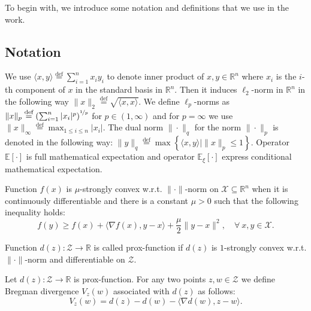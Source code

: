 \documentclass[runningheads]{llncs}
\def \R {\mathbb R}
\def\eqdef{\overset{\text{def}}{=}}
\newcommand{\EE}{\mathbf{E}}
\def\R{\mathbb{R}}
\def\R{\mathbb R}
\def\EE{\mathbb E}
\def\la{\langle}
\def\ra{\rangle}
\begin{document}
To begin with, we introduce some notation and definitions that we use in the work.

\subsection{Notation}

We use $\la x,y \ra \eqdef \sum_{i=1}^nx_i y_i$ to denote inner product of $x,y\in\R^n$ where $x_i$ is the $i$-th component of $x$ in the standard basis in $\R^n$. Then it induces $\ell_2$-norm in $\R^n$ in the following way $\|x\|_2 \eqdef \sqrt{\la x, x \ra}$. We define $\ell_p$-norms as $\|x\|_p \eqdef \left(\sum_{i=1}^n|x_i|^p\right)^{\nicefrac{1}{p}}$ for $p\in(1,\infty)$ and for $p = \infty$ we use $\|x\|_\infty \eqdef \max_{1\le i\le n}|x_i|$. The dual norm $\|\cdot\|_q$ for the norm $\|\cdot\|_p$ is denoted in the following way: $\|y\|_q \eqdef \max\left\{\la x, y \ra\mid \|x\|_p \le 1\right\}$. Operator $\EE[\cdot]$ is full mathematical expectation and operator $\EE_\xi[\cdot]$ express conditional mathematical expectation. 

\begin{definition}
Function $f(x)$ is $\mu$-strongly convex w.r.t. $\| \cdot \|$-norm on $\mathcal{X}\subseteq \R^n$ when it is continuously differentiable and there is a constant $\mu > 0$ such that the following inequality holds:
\begin{equation*}
\label{strong convexity}
f(y) \geq f(x) + \langle \nabla f(x), y-x \rangle + \frac{\mu}{2}\|y-x\|^2, \quad \forall\ x, y\in \mathcal{X}.
\end{equation*}
\end{definition}

\begin{definition}
Function $d(z): \mathcal{Z} \to \mathbb{R}$ is called prox-function if $d(z)$ is $1$-strongly convex w.r.t. $\| \cdot \|$-norm and differentiable on $\mathcal{Z}$. 
\end{definition}
\begin{definition}
Let $d(z): \mathcal{Z} \to \mathbb{R}$ is prox-function. For  any  two  points  $z,w \in \mathcal{Z}$ we define Bregman divergence $V_z(w)$ associated with $d(z)$ as follows: 
\begin{equation*}
    \label{Bregman}
    V_z(w) = d(z) - d(w) - \langle \nabla d(w), z - w \rangle.
\end{equation*}
\end{definition}
\end{document}
